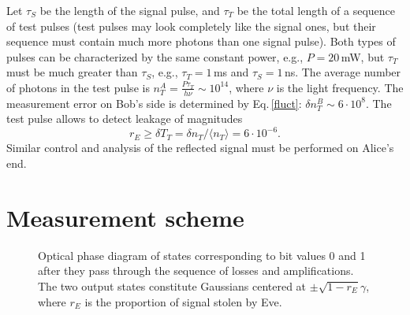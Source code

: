 \documentclass[a4paper]{article}
\begin{document}
Let $\tau_S$ be the length of the signal pulse, and $\tau_T$ be the total length of a sequence of test pulses (test pulses may look completely like the signal ones, but their sequence must contain much more photons than one signal pulse).
Both types of pulses can be characterized by the same constant power, e.g., $P=20$\,mW, but $\tau_T$ must be much greater than $\tau_S$, e.g., $\tau_T=1$\,ms and $\tau_S=1$\,ns.
The average number of photons in the test pulse is $n_T^A=\frac{P\tau_T}{h\nu}\sim10^{14}$, where $\nu$ is the light frequency.
The measurement error on Bob's side is determined by Eq.\,\eqref{fluct}: $\delta n_T^B\sim 6\cdot 10^8$.
The test pulse allows to detect leakage of magnitudes
\begin{equation}
    r_E\geq\delta T_T= \delta n_T/\langle n_T \rangle= 6 \cdot 10^{-6}.
\end{equation}
Similar control and analysis of the reflected signal must be performed on Alice's end.


\section{Measurement scheme}
\begin{figure}[t]
    \noindent{}
    \caption{
    Optical phase diagram of states corresponding to bit values 0 and 1 after they pass through the sequence of losses and amplifications.
    The two output states constitute Gaussians centered at $\pm\sqrt{1-r_E}\gamma$, where $r_E$ is the proportion of signal stolen by Eve. 
    } 
    \label{Fig3}
\end{figure}
\end{document}
